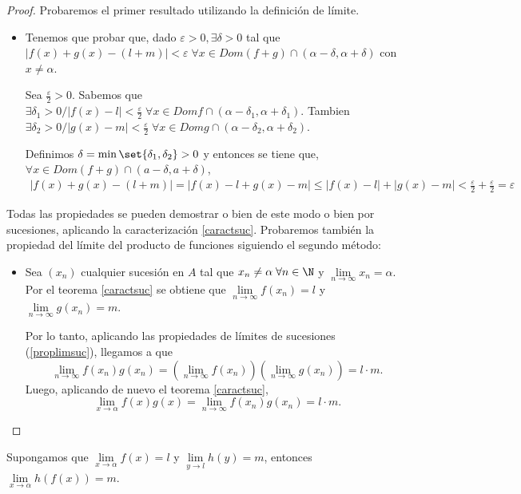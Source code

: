 \begin{proof}
	Probaremos el primer resultado utilizando la definición de límite.
	\begin{itemize}
		\item Tenemos que probar que, dado \(\varepsilon > 0, \exists \delta > 0 \) tal que \(\left\vert f(x) + g(x) - (l + m ) \right\vert < \varepsilon \; \forall x \in Dom(f + g) \cap (\alpha - \delta, \alpha + \delta)\) con \( x \neq \alpha \).

		      Sea \(\frac{\varepsilon}{2} > 0 \). Sabemos que \(\exists \delta_1 > 0 / \left\vert f(x) - l  \right\vert < \frac{\varepsilon}{2} \; \forall x \in Domf \cap (\alpha - \delta_1, \alpha + \delta_1) \). Tambien \(\exists  \delta_2 > 0 / \left\vert g(x) - m  \right\vert < \frac{\varepsilon}{2} \; \forall x \in Domg \cap (\alpha - \delta_2, \alpha + \delta_2)\).

		      Definimos \(\delta = \min \set{\delta_1,\delta_2} > 0 \) y entonces se tiene que, \(\forall x \in Dom(f + g) \cap (a - \delta, a + \delta)\),
		      \begin{multline*}
			      \left\vert f(x) + g(x) - (l + m ) \right\vert = \left\vert f(x) - l + g(x) - m  \right\vert \leq \left\vert f(x) - l  \right\vert + \left\vert g(x )  - m \right\vert < \frac{\varepsilon}{2} + \frac{\varepsilon}{2} = \varepsilon
		      \end{multline*}
	\end{itemize}
	Todas las propiedades se pueden demostrar o bien de este modo o bien por sucesiones, aplicando la caracterización \ref{caractsuc}. Probaremos también la propiedad del límite del producto de funciones siguiendo el segundo método:
	\begin{itemize}
		\item Sea \((x_n )\) cualquier sucesión en \(A \) tal que \(x_n \neq \alpha \; \forall n \in \N\) y \( \lim\limits_{n \to \infty} x_n = \alpha\). Por el teorema \ref{caractsuc} se obtiene que \(\lim\limits_{n \to \infty} f(x_n) = l \) y \(\lim\limits_{n \to \infty} g(x_n) = m\).

		      Por lo tanto, aplicando las propiedades de límites de sucesiones (\ref{proplimsuc}), llegamos a que
		      \[
			      \lim\limits_{n \to \infty} f(x_n) g(x_n) = (\lim\limits_{n \to \infty} f(x_n)) (\lim\limits_{n \to \infty} g(x_n)) = l \cdot m.
		      \]
		      Luego, aplicando de nuevo el teorema \ref{caractsuc},
		      \[
			      \lim\limits_{x  \to \alpha} f(x)g(x ) = \lim\limits_{n \to \infty} f(x_n) g(x_n) = l \cdot m.
		      \]
	\end{itemize}
\end{proof}
\begin{proposition}
	Supongamos que \(\lim\limits_{x  \to \alpha} f(x) = l \) y \(\lim\limits_{y  \to l} h(y) =m  \), entonces \(\lim\limits_{x  \to \alpha} h(f(x)) = m \).
\end{proposition}


